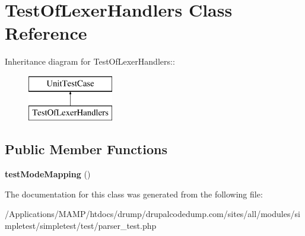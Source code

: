 \hypertarget{class_test_of_lexer_handlers}{
\section{TestOfLexerHandlers Class Reference}
\label{class_test_of_lexer_handlers}
}
Inheritance diagram for TestOfLexerHandlers::\begin{figure}[H]
\begin{center}
\leavevmode
\includegraphics[height=2cm]{class_test_of_lexer_handlers}
\end{center}
\end{figure}
\subsection*{Public Member Functions}
\begin{DoxyCompactItemize}
\item 
\hypertarget{class_test_of_lexer_handlers_a559f7b97c6d98fbb66d0415f2a615850}{
{\bfseries testModeMapping} ()}
\label{class_test_of_lexer_handlers_a559f7b97c6d98fbb66d0415f2a615850}

\end{DoxyCompactItemize}


The documentation for this class was generated from the following file:\begin{DoxyCompactItemize}
\item 
/Applications/MAMP/htdocs/drump/drupalcodedump.com/sites/all/modules/simpletest/simpletest/test/parser\_\-test.php\end{DoxyCompactItemize}

